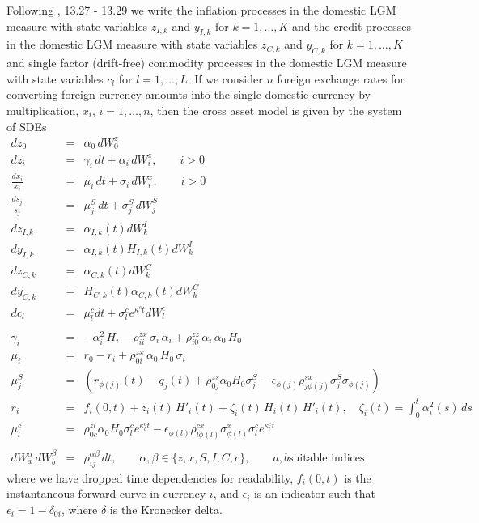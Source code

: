 Following \cite{Lichters}, 13.27 - 13.29 we write the inflation processes 
in the domestic LGM measure with state variables $z_{I,k}$ and $y_{I,k}$ for $k=1,\ldots,K$
and the credit processes in the domestic LGM measure with state variables $z_{C,k}$ and $y_{C,k}$ for $k=1,\ldots,K$ and single factor (drift-free) commodity processes in the domestic LGM measure with state variables $c_l$ for $l=1,\ldots,L$. 
If we consider $n$ 
foreign exchange rates for converting foreign currency amounts into the single domestic currency by multiplication, 
$x_i$, $i=1,\dots,n$, then the cross asset model is given by the system of SDEs
\begin{eqnarray*}
dz_0 &=& \alpha_0\,dW_0^z \\
dz_i &=& \gamma_i\,dt + \alpha_i\,dW_i^z,  \qquad i>0 \\
\frac{d x_i}{x_i} &=& \mu_i\, dt + \sigma_i\,dW_i^x, \qquad i > 0 \\
\frac{d s_j}{s_j} &=& \mu_j^S\, dt + \sigma_j^S\,dW_j^S \\
dz_{I,k} &=& \alpha_{I,k}(t)dW_k^I \\
dy_{I,k} &=& \alpha_{I,k}(t)H_{I,k}(t)dW_k^I \\
dz_{C,k} &=& \alpha_{C,k}(t)dW_k^C \\
dy_{C,k} &=& H_{C,k}(t)\alpha_{C,k}(t)dW_k^C \\ 
dc_{l} &=& \mu_l^c dt + \sigma^c_l e^{\kappa^c t}dW_l^c \\ \\
\gamma_i &=&
-\alpha_i^2\,H_i -\rho_{ii}^{zx}\,\sigma_i\,\alpha_i + \rho_{i0}^{zz}\,\alpha_i\,\alpha_0\,H_0\\
\mu_i &=& r_0 - r_i + \rho_{0i}^{zx}\,\alpha_0\,H_0\,\sigma_i\\
\mu_j^S &=& (r_{\phi(j)}(t) - q_j(t) + \rho_{0j}^{zs} \alpha_0 H_0 \sigma_j^S - \epsilon_{\phi(j)}
\rho_{j \phi(j)}^{sx}\sigma_j^S \sigma_{\phi(j)}) \\
r_i &=& f_i(0,t) + z_i(t)\,H'_i(t) + \zeta_i(t)\,H_i(t)\,H'_i(t),
\quad \zeta_i(t) = \int_0^t \alpha_i^2(s)\,ds  \\ 
\mu^c_l &=&  \rho_{0c}^{zl} \alpha_0 H_0 \sigma_l^c e^{\kappa_l^ct} - \epsilon_{\phi(l)}
\rho_{l \phi(l)}^{cx} \sigma^x_{\phi(l)} \sigma_l^c  e^{\kappa_l^ct}   \\ \\
dW^\alpha_a\,dW^\beta_b &=& \rho^{\alpha\beta}_{ij}\,dt, \qquad \alpha, \beta \in \{z, x, S, I, C, c\}, \qquad a, b \text{
                              suitable indices }
\end{eqnarray*}
where we have dropped time dependencies for readability, $f_i(0,t)$ is the instantaneous forward curve in currency $i$, 
and $\epsilon_i$ is an indicator such that $\epsilon_i = 1 - \delta_{0i}$, where $\delta$ is the Kronecker delta.

